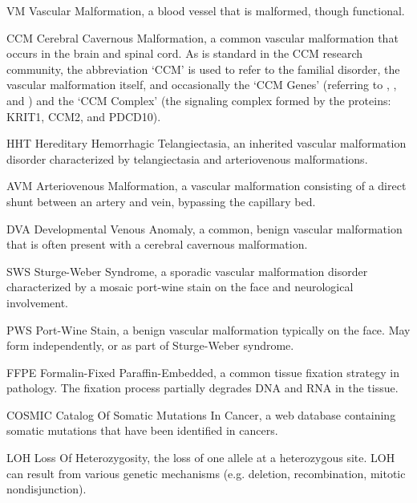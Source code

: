 \begin{symbollist}
	\item[VM] Vascular Malformation, a blood vessel that is malformed, though functional.
	
	\item[CCM] Cerebral Cavernous Malformation, a common vascular malformation that occurs in the brain and spinal cord. As is standard in the CCM research community, the abbreviation `CCM' is used to refer to the familial disorder, the vascular malformation itself, and occasionally the `CCM Genes' (referring to , , and ) and the `CCM Complex' (the signaling complex formed by the proteins: KRIT1, CCM2, and PDCD10). 
	
	\item[HHT] Hereditary Hemorrhagic Telangiectasia, an inherited vascular malformation disorder characterized by telangiectasia and arteriovenous malformations. 
	
	\item[AVM] Arteriovenous Malformation, a vascular malformation consisting of a direct shunt between an artery and vein, bypassing the capillary bed. 
	
	\item[DVA] Developmental Venous Anomaly, a common, benign vascular malformation that is often present with a cerebral cavernous malformation.
	
	\item[SWS] Sturge-Weber Syndrome, a sporadic vascular malformation disorder characterized by a mosaic port-wine stain on the face and neurological involvement. 
	
	\item[PWS] Port-Wine Stain, a benign vascular malformation typically on the face. May form independently, or as part of Sturge-Weber syndrome. 
	
	\item[FFPE] Formalin-Fixed Paraffin-Embedded, a common tissue fixation strategy in pathology. The fixation process partially degrades DNA and RNA in the tissue. 
	
	\item[COSMIC] Catalog Of Somatic Mutations In Cancer, a web database containing somatic mutations that have been identified in cancers. 
	
	\item[LOH] Loss Of Heterozygosity, the loss of one allele at a heterozygous site. LOH can result from various genetic mechanisms (e.g. deletion, recombination, mitotic nondisjunction).
	
\end{symbollist}
